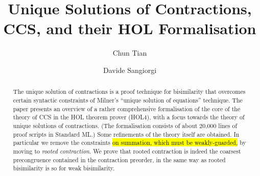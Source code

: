 \documentclass[3p]{elsarticle}
\begin{document}
\begin{frontmatter}

\title{Unique Solutions of Contractions, CCS, and their HOL
  Formalisation}

\author[mymainaddress]{Chun Tian}%
\address[mymainaddress]{Universit\`a di Trento and Fondazione Bruno
  Kessler, Italy}

\author[mysecondaryaddress]{Davide Sangiorgi}
\address[mysecondaryaddress]{Universit\`a di Bologna and INRIA, Italy}

\begin{abstract}
  The unique solution of contractions is a proof technique for
  bisimilarity that overcomes certain syntactic constraints of
  Milner's ``unique solution of equations'' technique.  The paper
  presents an overview of a rather comprehensive formalisation of the
  core of the theory of CCS in the HOL theorem prover (HOL4), with a
  focus towards the theory of unique solutions of contractions.  (The
  formalisation consists of about 20,000 lines of proof scripts in
  Standard ML.)  Some refinements of the theory itself are obtained.
  In particular we remove the constraints \hl{on summation,
  which must be weakly-guarded,} by moving to \emph{rooted
  contraction}. We prove that 
 rooted contraction is indeed the coarsest
  precongruence contained in the contraction preorder, in the same way
  as  rooted bisimilarity is  so for weak bisimilarity.


\end{abstract}
\end{frontmatter}
\end{document}
